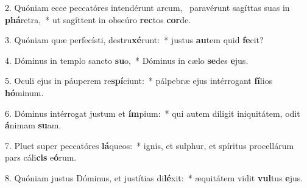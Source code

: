 2. Quóniam ecce peccatóres intendérunt arcum, \dag\  paravérunt sagíttas suas in \textbf{phá}retra,~*  ut sagíttent in obscúro \textbf{rec}tos \textbf{cor}de.\

3. Quóniam quæ perfecísti, destru\textbf{xé}runt:~*  justus \textbf{au}tem quid \textbf{fe}cit?\

4. Dóminus in templo sancto \textbf{su}o,~*  Dóminus in cælo \textbf{se}des \textbf{e}jus.\

5. Oculi ejus in páuperem re\textbf{spí}ciunt:~*  pálpebræ ejus intérrogant \textbf{fí}lios \textbf{hó}minum.\

6. Dóminus intérrogat justum et \textbf{ím}pium:~*  qui autem díligit iniquitátem, odit \textbf{á}nimam \textbf{su}am.\

7. Pluet super peccatóres \textbf{lá}queos:~*  ignis, et sulphur, et spíritus procellárum pars cáli\textbf{cis} e\textbf{ó}rum.\

8. Quóniam justus Dóminus, et justítias di\textbf{lé}xit:~*  æquitátem vidit \textbf{vul}tus \textbf{e}jus.\

